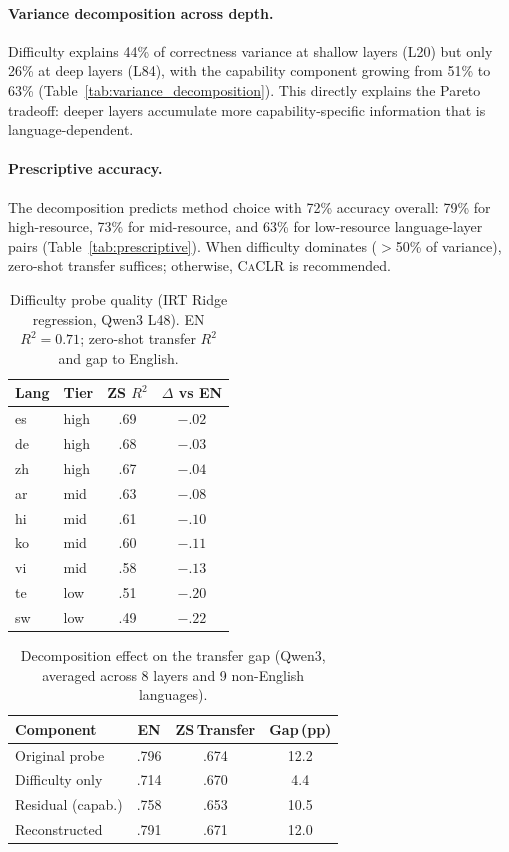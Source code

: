 \documentclass[11pt,a4paper]{article}
\newcommand{\caclr}{\textsc{CaCLR}}
\begin{document}
\paragraph{Variance decomposition across depth.}
Difficulty explains 44\% of correctness variance at shallow layers (L20) but only 26\% at deep layers (L84), with the capability component growing from 51\% to 63\% (Table~\ref{tab:variance_decomposition}).
This directly explains the Pareto tradeoff: deeper layers accumulate more capability-specific information that is language-dependent.

\paragraph{Prescriptive accuracy.}
The decomposition predicts method choice with 72\% accuracy overall: 79\% for high-resource, 73\% for mid-resource, and 63\% for low-resource language-layer pairs (Table~\ref{tab:prescriptive}).
When difficulty dominates ($>$50\% of variance), zero-shot transfer suffices; otherwise, \caclr{} is recommended.

\begin{table}[t]
\centering
\small
\caption{Difficulty probe quality (IRT Ridge regression, Qwen3 L48). EN $R^2=0.71$; zero-shot transfer $R^2$ and gap to English.}
\label{tab:difficulty_probe}
\begin{tabular}{llcc}
\toprule
Lang & Tier & ZS $R^2$ & $\Delta$ vs EN \\
\midrule
es & high & .69 & $-.02$ \\
de & high & .68 & $-.03$ \\
zh & high & .67 & $-.04$ \\
ar & mid & .63 & $-.08$ \\
hi & mid & .61 & $-.10$ \\
ko & mid & .60 & $-.11$ \\
vi & mid & .58 & $-.13$ \\
te & low & .51 & $-.20$ \\
sw & low & .49 & $-.22$ \\
\bottomrule
\end{tabular}
\end{table}

\begin{table}[t]
\centering
\small
\caption{Decomposition effect on the transfer gap (Qwen3, averaged across 8 layers and 9 non-English languages).}
\label{tab:decomposition_effect}
\begin{tabular}{lccc}
\toprule
Component & EN & ZS\,Transfer & Gap\,(pp) \\
\midrule
Original probe & .796 & .674 & 12.2 \\
Difficulty only & .714 & .670 & 4.4 \\
Residual (capab.) & .758 & .653 & 10.5 \\
Reconstructed & .791 & .671 & 12.0 \\
\bottomrule
\end{tabular}
\end{table}
\end{document}
